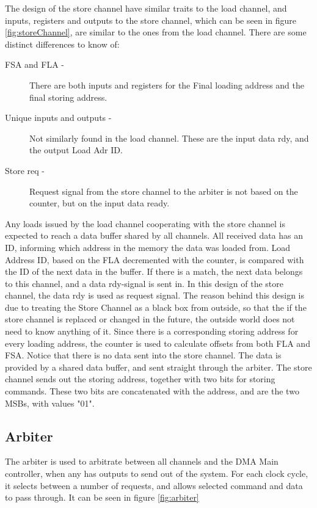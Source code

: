 \begin{appendix}
The design of the store channel have similar traits to the load channel, and inputs, registers and outputs to the store channel, which can be seen in figure \ref{fig:storeChannel}, are similar to the ones from the load channel.
There are some distinct differences to know of:
\begin{description}
    \item[FSA and FLA -]
    There are both inputs and registers for the Final loading address and the final storing address.
    \item[Unique inputs and outputs -]
    Not similarly found in the load channel.
    These are the input data rdy, and the output Load Adr ID.
    \item[Store req -]
    Request signal from the store channel to the arbiter is not based on the counter, but on the input data ready.
\end{description}

Any loads issued by the load channel cooperating with the store channel is expected to reach a data buffer shared by all channels.
All received data has an ID, informing which address in the memory the data was loaded from.
Load Address ID, based on the FLA decremented with the counter, is compared with the ID of the next data in the buffer.
If there is a match, the next data belongs to this channel, and a data rdy-signal is sent in.
In this design of the store channel, the data rdy is used as request signal.
The reason behind this design is due to treating the Store Channel as a black box from outside, so that the if the store channel is replaced or changed in the future, the outside world does not need to know anything of it.
Since there is a corresponding storing address for every loading address, the counter is used to calculate offsets from both FLA and FSA.
Notice that there is no data sent into the store channel.
The data is provided by a shared data buffer, and sent straight through the arbiter.
The store channel sends out the storing address, together with two bits for storing commands.
These two bits are concatenated with the address, and are the two MSBs, with values "01".

\subsection{Arbiter}
The arbiter is used to arbitrate between all channels and the DMA Main controller, when any has outputs to send out of the system.
For each clock cycle, it selects between a number of requests, and allows selected command and data to pass through.
It can be seen in figure \ref{fig:arbiter}


\end{appendix}
